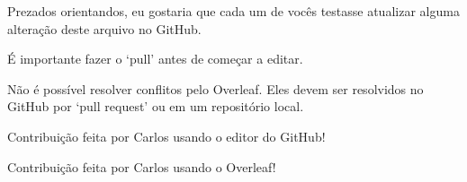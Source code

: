 \documentclass{article}
\begin{document}
Prezados orientandos,
eu gostaria que cada um de vocês testasse atualizar alguma alteração deste arquivo no GitHub.

É importante fazer o `pull' antes de começar a editar.

Não é possível resolver conflitos pelo Overleaf.
Eles devem ser resolvidos no GitHub por `pull request' ou em um repositório local.

Contribuição feita por Carlos usando o editor do GitHub!

Contribuição feita por Carlos usando o Overleaf!
\end{document}
